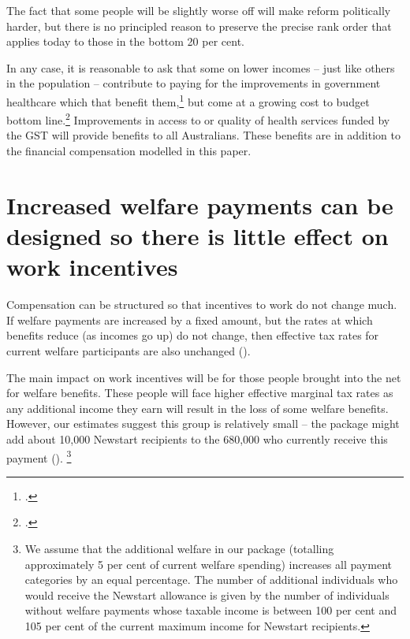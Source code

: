 \documentclass{grattanAlpha}
\begin{document}
The fact that some people will be slightly worse off will make reform politically harder, but there is no principled reason to preserve the precise rank order that applies today to those in the bottom 20 per cent.

In any case, it is reasonable to ask that some on lower incomes – just like others in the population – contribute to paying for the improvements in government healthcare which that benefit them,\footcite[][14]{Deloitte2015TaxReformSheddingLight}  but come at a growing cost to budget bottom line.\footcite[][20]{DaleyWoodWeidmannEtAl2014}  Improvements in access to or quality of health services funded by the GST will provide benefits to all Australians. These benefits are in addition to the financial compensation modelled in this paper.

\section{Increased welfare payments can be designed so there is little effect on work incentives\label{sec:GST-3-3}}
Compensation can be structured so that incentives to work do not change much. If welfare payments are increased by a fixed amount, but the rates at which benefits reduce (as incomes go up) do not change, then effective tax rates for current welfare participants are also unchanged ().

The main impact on work incentives will be for those people brought into the net for welfare benefits. These people will face higher effective marginal tax rates as any additional income they earn will result in the loss of some welfare benefits. However, our estimates suggest this group is relatively small – the package might add about 10,000 Newstart recipients to the 680,000 who currently receive this payment ().%
\footnote{We assume that the additional welfare in our package (totalling approximately 5 per cent of current welfare spending) increases all payment categories by an equal percentage. The number of additional individuals who would receive the Newstart allowance is given by the number of individuals without welfare payments whose taxable income is between 100 per cent and 105 per cent of the current maximum income for Newstart recipients.}   
\end{document}
